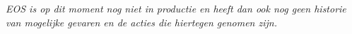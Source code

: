 \textit{EOS is op dit moment nog niet in productie en heeft dan ook nog geen historie van mogelijke gevaren en de acties die hiertegen genomen zijn.}
